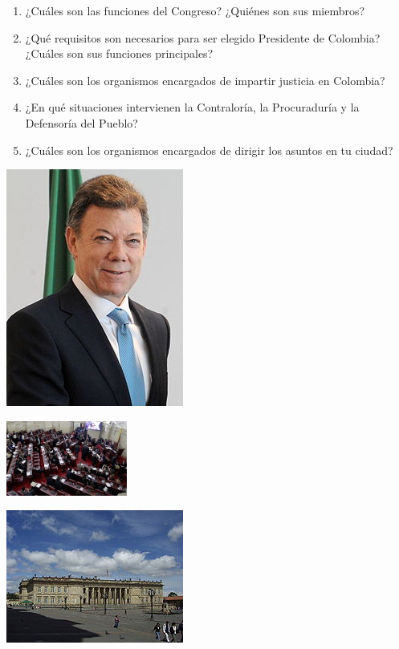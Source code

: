 \documentclass[10pt,twoside]{article}
\begin{document}
\begin{minipage}{.8\textwidth}
\begin{enumerate}
\item ¿Cuáles son las funciones del Congreso? ¿Quiénes son sus miembros? 
\item ¿Qué requisitos son necesarios para ser elegido Presidente de Colombia? ¿Cuáles son sus funciones principales? 
\item ¿Cuáles son los organismos encargados de impartir justicia en Colombia?
\item ¿En qué situaciones intervienen la Contraloría, la
Procuraduría y la Defensoría del Pueblo? 
\item ¿Cuáles son los organismos encargados de dirigir los asuntos en tu ciudad?
\end{enumerate}
\end{minipage}
\begin{minipage}{.2\textwidth}
\includegraphics[scale=1]{Images/220px-Juan_Manue_Santos_and_Lula.jpg}
\end{minipage}

\begin{minipage}{.4\textwidth}
\includegraphics[scale=1]{Images/senado.jpg} 
\end{minipage}
\begin{minipage}{.6\textwidth}
\includegraphics[scale=.75]{Images/220px-CapitolioNacionalDeColombia2004-7.jpg} 
\end{minipage}
\end{document}
